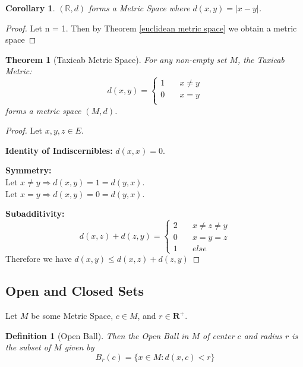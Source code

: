 \documentclass{article}
\newtheorem{definition}{Definition}[section]
\newtheorem{theorem}{Theorem}[section]
\newtheorem{corollary}{Corollary}[theorem]
\begin{document}
			\begin{corollary}
				$(\mathbb{R}, d)$ forms a Metric Space where $d(x, y) = |x - y|$.
			\end{corollary}
			\begin{proof}
				Let n = 1. Then by Theorem \ref{euclidean metric space} we obtain a metric space
			\end{proof}

			\begin{theorem}[Taxicab Metric Space]
			\label{taxicab metric space}
				For any non-empty set $M$, the Taxicab Metric:
				\begin{equation*}
					d(x, y)=\begin{cases}
							  1 \quad & x \neq y \\
							  0 \quad & x = y \\
						 \end{cases}
				\end{equation*}
				forms a metric space $(M, d)$.
				\end{theorem}
				\begin{proof}
					Let $x, y, z \in E$.
					\item \textbf{Identity of Indiscernibles:} $d(x, x) = 0$.
					\item \textbf{Symmetry:} \\
						Let $x \neq y \Rightarrow d(x, y) = 1 = d(y, x)$.\\
						Let $x=y \Rightarrow d(x, y) = 0 = d(y, x)$.
					\item \textbf{Subadditivity:}
						\begin{equation*}
							d(x, z) + d(z, y)=\begin{cases}
									2 \quad & x \neq z \neq y \\
									0 \quad & x = y = z \\
									1 \quad &else
								\end{cases}
						\end{equation*}
						Therefore we have $d(x, y) \leq d(x, z) + d(z, y)$

				\end{proof}
		\subsection{Open and Closed Sets}
			Let $M$ be some Metric Space, $c \in M$, and $r \in \mathbf{R}^+$.
			\begin{definition}[Open Ball]
			\label{open ball}
				Then the Open Ball in $M$ of center $c$ and radius $r$ is the subset of $M$ given by
				$$B_r(c) = \{x \in M: d(x, c) < r \}$$
			\end{definition}
		
\end{document}
